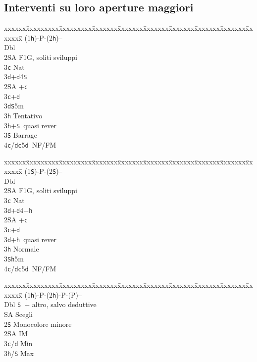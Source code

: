 \documentclass[a4paper,italian]{article}
\newcommand{\BS}{\small{\texttt{S}}}
\newcommand{\BC}{\small{\texttt{c}}}
\newcommand{\BD}{\small{\texttt{d}}}
\newcommand{\BH}{\small{\texttt{h}}}
\newenvironment{bidtable}
{\begin{tabbing}

    xxxxxx\=xxxxxxxxx\=xxxxxxxxx\=xxxxxxx\=xxxxxxx\=xxxxxxx\=xxxxxxx\=xxxxxxx\=xxxxxxx\=xxxxxxx\=\kill}
{\end{tabbing} }%
\begin{document}
\begin{multicols}{2}
    \subsection{Interventi su loro aperture maggiori}

    \begin{bidtable}
        (1\BH)-P-(2\BH)--\+\\
        Dbl\+\\
        2\small{SA} \> F1G, soliti sviluppi\\
        3\BC\> Nat\+\\
        3\BD {}+\BD4\BS \-\-\\
        2\small{SA} +\BC \\
        3\BC {}+\BD \\
        3\BD {}\BS 5m\+\\
        3\BH \> Tentativo\-\\
        3\BH {}+\BS\ quasi rever\\
        3\BS \> Barrage\\
        4\BC/\BD {}\BC 5\BD\ NF/FM
    \end{bidtable}
    \begin{bidtable}
        (1\BS)-P-(2\BS)--\+\\
        Dbl\+\\
        2\small{SA} \> F1G, soliti sviluppi\\
        3\BC\> Nat\+\\
        3\BD {}+\BD4+\BH \-\-\\
        2\small{SA} +\BC \\
        3\BC {}+\BD \\
        3\BD {}+\BH\ quasi rever\\
        3\BH \> Normale\\
        3\BS {}\BH 5m\\
        4\BC/\BD {}\BC 5\BD\ NF/FM
    \end{bidtable}
    \begin{bidtable}
        (1\BH)-P-(2\BH)-P-(P)--\+\\
        Dbl \BS\ + altro, salvo deduttive\\
        \small{SA} Scegli\\
        2\BS \> Monocolore minore\+\\
        2\small{SA} \> IM\+\\
        3\BC/\BD \> Min\\
        3\BH/\BS \> Max\-\\

\end{bidtable}
\end{multicols}
\end{document}
